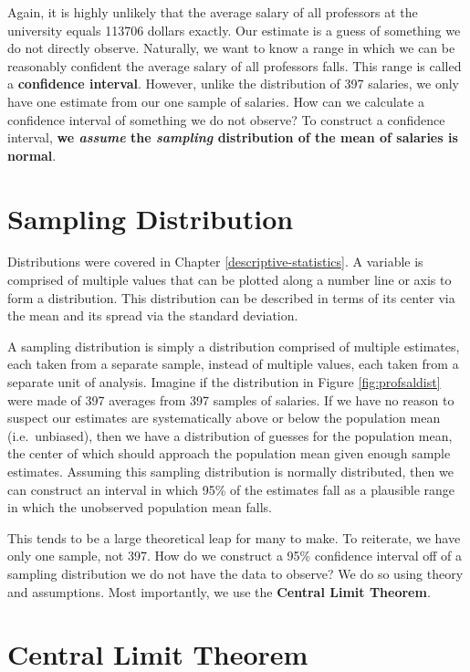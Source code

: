 \documentclass[
]{book}
\begin{document}
Again, it is highly unlikely that the average salary of all professors at the university equals 113706 dollars exactly. Our estimate is a guess of something we do not directly observe. Naturally, we want to know a range in which we can be reasonably confident the average salary of all professors falls. This range is called a \textbf{confidence interval}. However, unlike the distribution of 397 salaries, we only have one estimate from our one sample of salaries. How can we calculate a confidence interval of something we do not observe? To construct a confidence interval, \textbf{we \emph{assume} the \emph{sampling} distribution of the mean of salaries is normal}.

\hypertarget{sampling-distribution}{%
\section{Sampling Distribution}\label{sampling-distribution}}

Distributions were covered in Chapter \ref{descriptive-statistics}. A variable is comprised of multiple values that can be plotted along a number line or axis to form a distribution. This distribution can be described in terms of its center via the mean and its spread via the standard deviation.

A sampling distribution is simply a distribution comprised of multiple estimates, each taken from a separate sample, instead of multiple values, each taken from a separate unit of analysis. Imagine if the distribution in Figure \ref{fig:profsaldist} were made of 397 averages from 397 samples of salaries. If we have no reason to suspect our estimates are systematically above or below the population mean (i.e.~unbiased), then we have a distribution of guesses for the population mean, the center of which should approach the population mean given enough sample estimates. Assuming this sampling distribution is normally distributed, then we can construct an interval in which 95\% of the estimates fall as a plausible range in which the unobserved population mean falls.

This tends to be a large theoretical leap for many to make. To reiterate, we have only one sample, not 397. How do we construct a 95\% confidence interval off of a sampling distribution we do not have the data to observe? We do so using theory and assumptions. Most importantly, we use the \textbf{Central Limit Theorem}.

\hypertarget{central-limit-theorem}{%
\section{Central Limit Theorem}\label{central-limit-theorem}}
\end{document}

